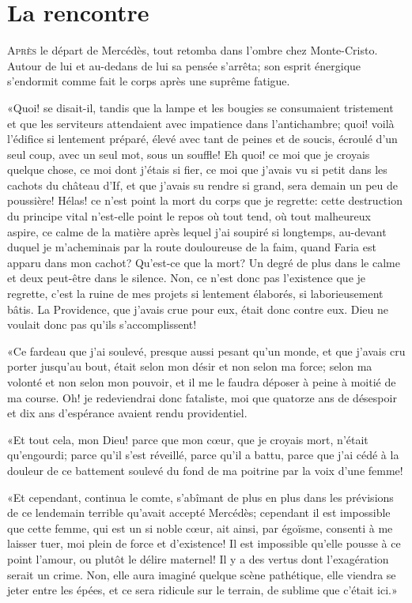 \chapter{La rencontre}

\lettrine{A}{près} le départ de Mercédès, tout retomba dans l'ombre chez Monte-Cristo. Autour de lui et au-dedans de lui sa pensée s'arrêta; son esprit énergique s'endormit comme fait le corps après une suprême fatigue. 

«Quoi! se disait-il, tandis que la lampe et les bougies se consumaient tristement et que les serviteurs attendaient avec impatience dans l'antichambre; quoi! voilà l'édifice si lentement préparé, élevé avec tant de peines et de soucis, écroulé d'un seul coup, avec un seul mot, sous un souffle! Eh quoi! ce moi que je croyais quelque chose, ce moi dont j'étais si fier, ce moi que j'avais vu si petit dans les cachots du château d'If, et que j'avais su rendre si grand, sera demain un peu de poussière! Hélas! ce n'est point la mort du corps que je regrette: cette destruction du principe vital n'est-elle point le repos où tout tend, où tout malheureux aspire, ce calme de la matière après lequel j'ai soupiré si longtemps, au-devant duquel je m'acheminais par la route douloureuse de la faim, quand Faria est apparu dans mon cachot? Qu'est-ce que la mort? Un degré de plus dans le calme et deux peut-être dans le silence. Non, ce n'est donc pas l'existence que je regrette, c'est la ruine de mes projets si lentement élaborés, si laborieusement bâtis. La Providence, que j'avais crue pour eux, était donc contre eux. Dieu ne voulait donc pas qu'ils s'accomplissent! 

«Ce fardeau que j'ai soulevé, presque aussi pesant qu'un monde, et que j'avais cru porter jusqu'au bout, était selon mon désir et non selon ma force; selon ma volonté et non selon mon pouvoir, et il me le faudra déposer à peine à moitié de ma course. Oh! je redeviendrai donc fataliste, moi que quatorze ans de désespoir et dix ans d'espérance avaient rendu providentiel. 

«Et tout cela, mon Dieu! parce que mon cœur, que je croyais mort, n'était qu'engourdi; parce qu'il s'est réveillé, parce qu'il a battu, parce que j'ai cédé à la douleur de ce battement soulevé du fond de ma poitrine par la voix d'une femme! 

«Et cependant, continua le comte, s'abîmant de plus en plus dans les prévisions de ce lendemain terrible qu'avait accepté Mercédès; cependant il est impossible que cette femme, qui est un si noble cœur, ait ainsi, par égoïsme, consenti à me laisser tuer, moi plein de force et d'existence! Il est impossible qu'elle pousse à ce point l'amour, ou plutôt le délire maternel! Il y a des vertus dont l'exagération serait un crime. Non, elle aura imaginé quelque scène pathétique, elle viendra se jeter entre les épées, et ce sera ridicule sur le terrain, de sublime que c'était ici.» 


